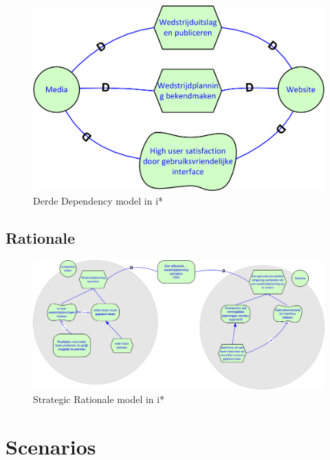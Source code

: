 \documentclass[12pt,a4paper]{article}
\begin{document}
			\begin{figure}[H]
				\includegraphics[width=\textwidth]{../2-Doelen/istar3.png}
				\caption{Derde Dependency model in i*}
			\end{figure}
			\subsection{Rationale}
			\begin{figure}[H]
				\includegraphics[width=\textwidth]{../2-Doelen/istar4.png}
				\caption{Strategic Rationale model in i*}
			\end{figure}
		\section{Scenarios}
\end{document}
